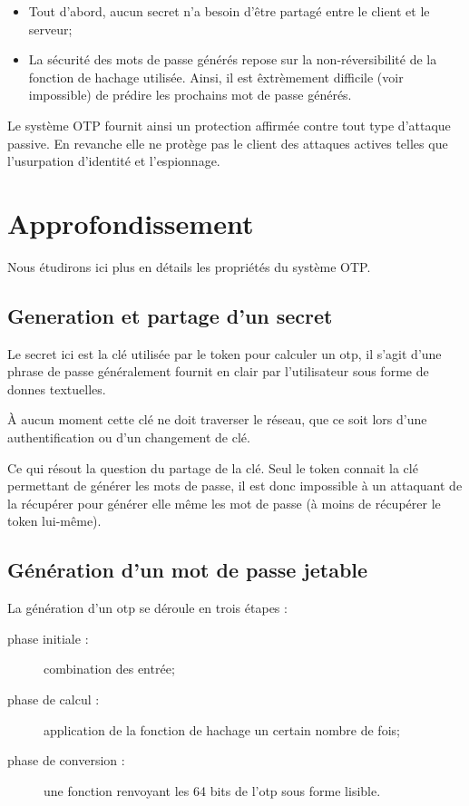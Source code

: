 \documentclass{../res/univ-projet}
\begin{document}
  \begin{itemize}
    \item Tout d'abord, aucun secret n'a besoin d'être partagé entre le client et le serveur;
    \item La sécurité des mots de passe générés repose sur la non-réversibilité de la fonction de hachage utilisée. Ainsi, il est \^extrèmement difficile (voir impossible) de prédire les prochains mot de passe générés.\\
  \end{itemize}

  Le système OTP fournit ainsi un protection affirmée contre tout type d'attaque passive. En revanche elle ne protège pas le client des attaques actives telles que l'usurpation d'identité et l'espionnage.

\section{Approfondissement}
  Nous étudirons ici plus en détails  les propriétés du système OTP.

  \subsection{Generation et partage d'un secret}
    Le secret ici est la clé utilisée par le token pour calculer un otp, il s'agit d'une phrase de passe généralement fournit en clair par l'utilisateur sous forme de donnes textuelles. 

    À aucun moment cette clé ne doit traverser le réseau, que ce soit lors d'une authentification ou d'un changement de clé.

    Ce qui résout la question du partage de la clé. Seul le token connait la clé permettant de générer les mots de passe, il est donc impossible à un attaquant de la récupérer pour générer elle même les mot de passe (à moins de récupérer le token lui-même).
  
  \subsection{Génération d'un mot de passe jetable}

    La génération d'un otp se déroule en trois étapes :
    \begin{description}
      \item [phase initiale :] combination des entrée;
      \item [phase de calcul :] application de la fonction de hachage un certain nombre de fois;
      \item [phase de conversion :] une fonction renvoyant les 64 bits de l'otp sous forme lisible.\\
    \end{description}
\end{document}
